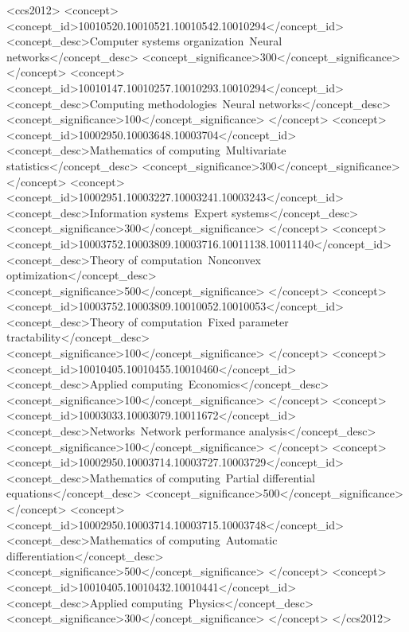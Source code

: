 \documentclass[sigconf, authorversion=true, nonacm=true]{acmart}
\begin{document}
\begin{CCSXML}
<ccs2012>
   <concept>
       <concept_id>10010520.10010521.10010542.10010294</concept_id>
       <concept_desc>Computer systems organization~Neural networks</concept_desc>
       <concept_significance>300</concept_significance>
       </concept>
   <concept>
       <concept_id>10010147.10010257.10010293.10010294</concept_id>
       <concept_desc>Computing methodologies~Neural networks</concept_desc>
       <concept_significance>100</concept_significance>
       </concept>
   <concept>
       <concept_id>10002950.10003648.10003704</concept_id>
       <concept_desc>Mathematics of computing~Multivariate statistics</concept_desc>
       <concept_significance>300</concept_significance>
       </concept>
   <concept>
       <concept_id>10002951.10003227.10003241.10003243</concept_id>
       <concept_desc>Information systems~Expert systems</concept_desc>
       <concept_significance>300</concept_significance>
       </concept>
   <concept>
       <concept_id>10003752.10003809.10003716.10011138.10011140</concept_id>
       <concept_desc>Theory of computation~Nonconvex optimization</concept_desc>
       <concept_significance>500</concept_significance>
       </concept>
   <concept>
       <concept_id>10003752.10003809.10010052.10010053</concept_id>
       <concept_desc>Theory of computation~Fixed parameter tractability</concept_desc>
       <concept_significance>100</concept_significance>
       </concept>
   <concept>
       <concept_id>10010405.10010455.10010460</concept_id>
       <concept_desc>Applied computing~Economics</concept_desc>
       <concept_significance>100</concept_significance>
       </concept>
   <concept>
       <concept_id>10003033.10003079.10011672</concept_id>
       <concept_desc>Networks~Network performance analysis</concept_desc>
       <concept_significance>100</concept_significance>
       </concept>
    <concept>
        <concept_id>10002950.10003714.10003727.10003729</concept_id>
        <concept_desc>Mathematics of computing~Partial differential equations</concept_desc>
        <concept_significance>500</concept_significance>
    </concept>
    <concept>
        <concept_id>10002950.10003714.10003715.10003748</concept_id>
        <concept_desc>Mathematics of computing~Automatic differentiation</concept_desc>
        <concept_significance>500</concept_significance>
    </concept>
   <concept>
       <concept_id>10010405.10010432.10010441</concept_id>
       <concept_desc>Applied computing~Physics</concept_desc>
       <concept_significance>300</concept_significance>
       </concept>
</ccs2012>
\end{CCSXML}
\end{document}
